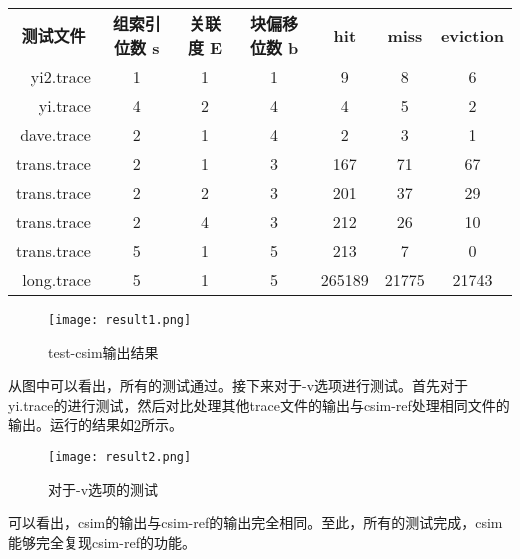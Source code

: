 \begin{center}
    \label{tab:example}
    \begin{longtable}{r c c c c c c}
        \toprule
        \multicolumn{1}{c}{\textbf{测试文件}} &
        \multicolumn{1}{c}{\textbf{组索引位数 s}} &
        \multicolumn{1}{c}{\textbf{关联度 E}} &
        \multicolumn{1}{c}{\textbf{块偏移位数 b}} &
        \multicolumn{1}{c}{\textbf{hit}} &
        \multicolumn{1}{c}{\textbf{miss}} &
        \multicolumn{1}{c}{\textbf{eviction}}            \\
        \cmidrule(lr){1-1} \cmidrule(lr){2-4} \cmidrule(lr){5-7}
        yi2.trace   & 1 & 1 & 1 & 9      & 8     & 6     \\
        yi.trace    & 4 & 2 & 4 & 4      & 5     & 2     \\
        dave.trace  & 2 & 1 & 4 & 2      & 3     & 1     \\
        trans.trace & 2 & 1 & 3 & 167    & 71    & 67    \\
        trans.trace & 2 & 2 & 3 & 201    & 37    & 29    \\
        trans.trace & 2 & 4 & 3 & 212    & 26    & 10    \\
        trans.trace & 5 & 1 & 5 & 213    & 7     & 0     \\
        long.trace  & 5 & 1 & 5 & 265189 & 21775 & 21743 \\
        \bottomrule
    \end{longtable}
\end{center}

\begin{figure}[htb]
    \centering
    \texttt{[image: result1.png]}
    \caption{test-csim输出结果}
    \label{fig:result1}
\end{figure}

\par 从图中可以看出，所有的测试通过。接下来对于-v选项进行测试。首先对于yi.trace的进行测试，然后对比处理其他trace文件的输出与csim-ref处理相同文件的输出。运行的结果如\ref{fig:result2}所示。

\begin{figure}[htb]
    \centering
    \texttt{[image: result2.png]}
    \caption{对于-v选项的测试}
    \label{fig:result2}
\end{figure}

\par 可以看出，csim的输出与csim-ref的输出完全相同。至此，所有的测试完成，csim能够完全复现csim-ref的功能。


